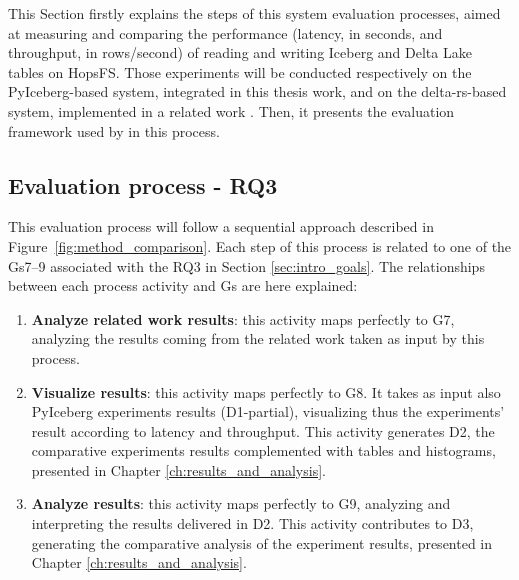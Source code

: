 This Section firstly explains the steps of this system evaluation processes, aimed at measuring and comparing the performance (latency, in seconds, and throughput, in rows/second) of reading and writing Iceberg and Delta Lake tables on \gls{HopsFS}. Those experiments will be conducted respectively on the PyIceberg-based system, integrated in this thesis work, and on the delta-rs-based system, implemented in a related work \cite{manfrediReducingReadWrite2024}. Then, it presents the evaluation framework used by in this process.



\subsection{Evaluation process - RQ3}
\label{subsec:eval_process_iceberg_delta}
This evaluation process will follow a sequential approach described in Figure~\ref{fig:method_comparison}. Each step of this process is related to one of the \glspl{G}7--9 associated with the \gls{RQ}3 in Section \ref{sec:intro_goals}. The relationships between each process activity and \glspl{G} are here explained:
\begin{enumerate}
    \item \textbf{Analyze related work results}: this activity maps perfectly to \gls{G}7, analyzing the results coming from the related work taken as input by this process.
    \item \textbf{Visualize results}: this activity maps perfectly to \gls{G}8. It takes as input also PyIceberg experiments results (\gls{D}1-partial), visualizing thus the experiments' result according to latency and throughput. This activity generates \gls{D}2, the comparative experiments results complemented with tables and histograms, presented in Chapter \ref{ch:results_and_analysis}.
    \item \textbf{Analyze results}: this activity maps perfectly to \gls{G}9, analyzing and interpreting the results delivered in \gls{D}2. This activity contributes to \gls{D}3, generating the comparative analysis of the experiment results, presented in Chapter \ref{ch:results_and_analysis}.
\end{enumerate}
